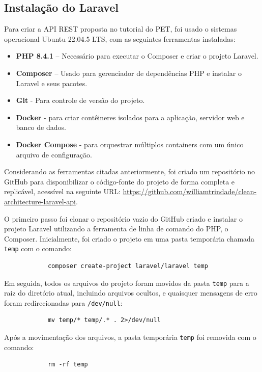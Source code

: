         \subsection{Instalação do Laravel}
        
            \par Para criar a API REST proposta no tutorial do PET, foi usado o sistemas operacional Ubuntu 22.04.5 LTS, com as seguintes ferramentas instaladas:
    
            \begin{itemize}
                \item \textbf{PHP 8.4.1} – Necessário para executar o Composer e criar o projeto Laravel.
                \item \textbf{Composer} – Usado para gerenciador de dependências PHP e instalar o Laravel e seus pacotes.
                \item \textbf{Git} - Para controle de versão do projeto.
                \item \textbf{Docker} - para criar contêineres isolados para a aplicação, servidor web e banco de dados.
                \item \textbf{Docker Compose} - para orquestrar múltiplos containers com um único arquivo de configuração.
            \end{itemize}
    
            \par Considerando as ferramentas citadas anteriormente, foi criado um repositório no GitHub para disponibilizar o código-fonte do projeto de forma completa e replicável, acessível na seguinte URL: \url{https://github.com/williamtrindade/clean-architecture-laravel-api}.
    
            \par O primeiro passo foi clonar o repositório vazio do GitHub criado e instalar o projeto Laravel utilizando a ferramenta de linha de comando do PHP, o Composer. Inicialmente, foi criado o projeto em uma pasta temporária chamada \texttt{temp} com o comando:
            \begin{verbatim}
            composer create-project laravel/laravel temp
            \end{verbatim}
        
            \par Em seguida, todos os arquivos do projeto foram movidos da pasta \texttt{temp} para a raiz do diretório atual, incluindo arquivos ocultos, e quaisquer mensagens de erro foram redirecionadas para \texttt{/dev/null}:
            \begin{verbatim}
            mv temp/* temp/.* . 2>/dev/null
            \end{verbatim}
            Após a movimentação dos arquivos, a pasta temporária \texttt{temp} foi removida com o comando:
            \begin{verbatim}
            rm -rf temp
            \end{verbatim}


